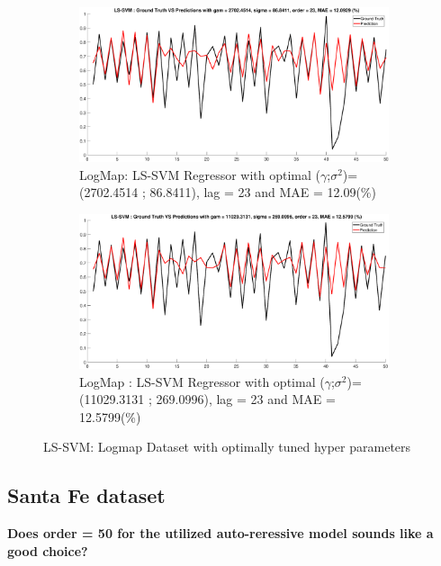 \begin{figure}[!ht] 
	\begin{subfigure}{.5\textwidth}
		\centering
		\captionsetup{width=0.8\linewidth}
		\includegraphics[height=.5\linewidth, width=0.85\linewidth]{Exercise2/Report/Hw_tuned1}
		\caption{LogMap: LS-SVM Regressor with optimal ($\gamma$;$\sigma^2$)=(2702.4514 ; 86.8411), lag = 23 and MAE = 12.09(\%)}
		\label{fig:hw_tuned1}
	\end{subfigure}%
	\begin{subfigure}{.5\textwidth}
		\centering
		\captionsetup{width=0.8\linewidth}
		\includegraphics[height=.5\linewidth, width=0.85\linewidth]{Exercise2/Report/Hw_tuned3}
		\caption{LogMap : LS-SVM Regressor with optimal ($\gamma$;$\sigma^2$)=(11029.3131 ; 269.0996), lag = 23 and MAE = 12.5799(\%)}
		\label{fig:hw_tuned2}
	\end{subfigure}
\caption{LS-SVM: Logmap Dataset with optimally tuned hyper parameters}
\label{fig:hw2}
\end{figure}
\subsection{Santa Fe dataset}
\textbf{Does order = 50 for the utilized auto-reressive model sounds like a good choice?}


